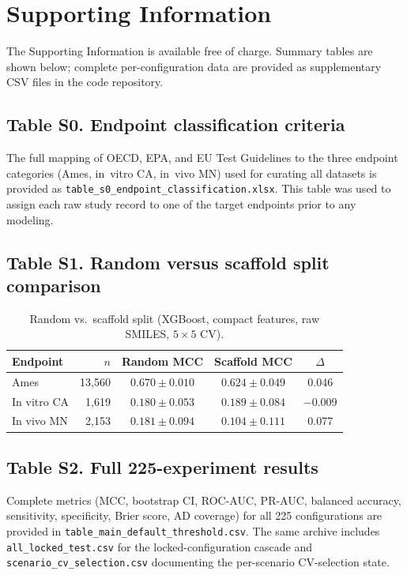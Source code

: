\section*{Supporting Information}

The Supporting Information is available free of charge. Summary tables are shown below; 
complete per-configuration data are provided as supplementary CSV files in the code 
repository.

\subsection*{Table S0. Endpoint classification criteria}

The full mapping of OECD, EPA, and EU Test Guidelines to the three endpoint categories 
(Ames, in~vitro CA, in~vivo MN) used for curating all datasets is provided as 
\texttt{table\_s0\_endpoint\_classification.xlsx}. This table was used to assign each raw 
study record to one of the target endpoints prior to any modeling.

\subsection*{Table S1. Random versus scaffold split comparison}

\begin{table}[ht]
\caption{Random vs.\ scaffold split (XGBoost, compact features, raw SMILES, 
$5\!\times\!5$ CV).}
\centering
\small
\begin{tabular}{@{}lrccc@{}}
\toprule
Endpoint    & $n$    & Random MCC        & Scaffold MCC      & $\Delta$ \\
\midrule
Ames        & 13,560 & $0.670 \pm 0.010$ & $0.624 \pm 0.049$ &  0.046   \\
In vitro CA &  1,619 & $0.180 \pm 0.053$ & $0.189 \pm 0.084$ & $-$0.009 \\
In vivo MN  &  2,153 & $0.181 \pm 0.094$ & $0.104 \pm 0.111$ &  0.077   \\
\bottomrule
\end{tabular}
\end{table}

\subsection*{Table S2. Full 225-experiment results}

Complete metrics (MCC, bootstrap CI, ROC-AUC, PR-AUC, balanced accuracy, sensitivity, 
specificity, Brier score, AD coverage) for all 225 configurations are provided in 
\texttt{table\_main\_default\_threshold.csv}. The same archive includes 
\texttt{all\_locked\_test.csv} for the locked-configuration cascade and 
\texttt{scenario\_cv\_selection.csv} documenting the per-scenario CV-selection state.

